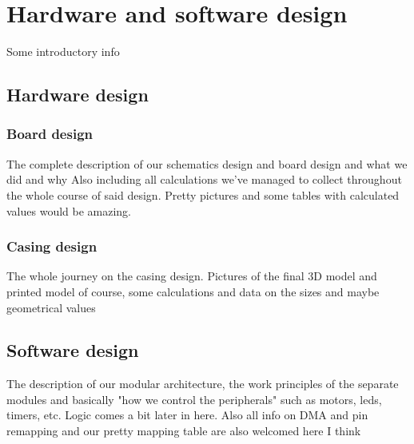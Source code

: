 \section{Hardware and software design}

Some introductory info

\subsection{Hardware design}

    \subsubsection{Board design}

    The complete description of our schematics design and board design and what we did and why
    Also including all calculations we've managed to collect throughout the whole course of said design.
    Pretty pictures and some tables with calculated values would be amazing.

    \subsubsection{Casing design}

    The whole journey on the casing design. Pictures of the final 3D model and printed model of course, some calculations and data on the sizes and maybe geometrical values 
    
\subsection{Software design}

    The description of our modular architecture, the work principles of the separate modules and basically "how we control the peripherals" such as motors, leds, timers, etc. Logic comes a bit later in here.
    Also all info on DMA and pin remapping and our pretty mapping table are also welcomed here I think


